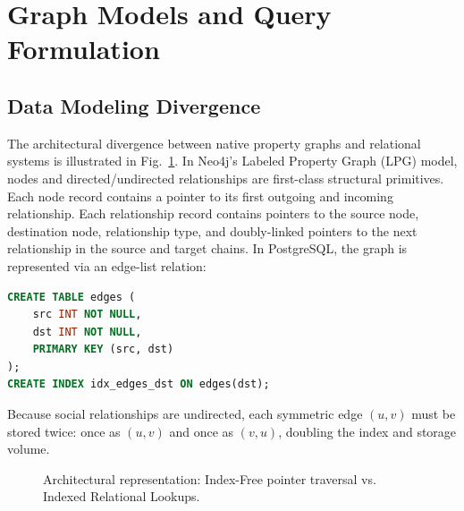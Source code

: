 \documentclass[conference,10pt]{IEEEtran}%
\begin{document}
\section{Graph Models and Query Formulation}

\subsection{Data Modeling Divergence}
The architectural divergence between native property graphs and relational systems is illustrated in Fig.~\ref{fig:models}.
In Neo4j's Labeled Property Graph (LPG) model, nodes and directed/undirected relationships are first-class structural primitives. Each node record contains a pointer to its first outgoing and incoming relationship. Each relationship record contains pointers to the source node, destination node, relationship type, and doubly-linked pointers to the next relationship in the source and target chains.
In PostgreSQL, the graph is represented via an edge-list relation:
\begin{lstlisting}[language=SQL]
CREATE TABLE edges (
    src INT NOT NULL,
    dst INT NOT NULL,
    PRIMARY KEY (src, dst)
);
CREATE INDEX idx_edges_dst ON edges(dst);
\end{lstlisting}
Because social relationships are undirected, each symmetric edge $(u, v)$ must be stored twice: once as $(u, v)$ and once as $(v, u)$, doubling the index and storage volume.

\begin{figure}[htbp]
\centering
{}
\caption{Architectural representation: Index-Free pointer traversal vs. Indexed Relational Lookups.}
\label{fig:models}
\end{figure}
\end{document}
